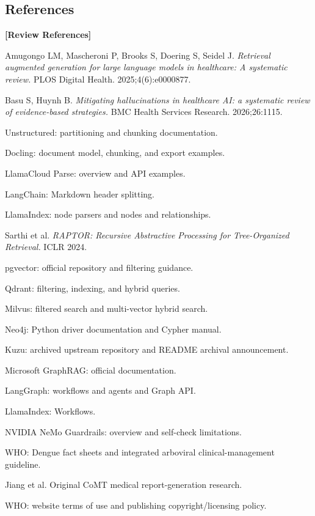 \documentclass[11pt,a4paper]{article}
\newcommand{\origintag}[2]{\textcolor{#1}{\small\textbf{[#2]}}}
\begin{document}
\subsection{References}
\origintag{amber}{Review References}
\begin{enumerate}[label={[\arabic*]}, font=\small, itemsep=2pt, parsep=0pt]
\scriptsize
\item Amugongo LM, Mascheroni P, Brooks S, Doering S, Seidel J. \textit{Retrieval augmented generation for large language models in healthcare: A systematic review.} PLOS Digital Health. 2025;4(6):e0000877.
\item Basu S, Huynh B. \textit{Mitigating hallucinations in healthcare AI: a systematic review of evidence-based strategies.} BMC Health Services Research. 2026;26:1115.
\item Unstructured: partitioning and chunking documentation.
\item Docling: document model, chunking, and export examples.
\item LlamaCloud Parse: overview and API examples.
\item LangChain: Markdown header splitting.
\item LlamaIndex: node parsers and nodes and relationships.
\item Sarthi et al. \textit{RAPTOR: Recursive Abstractive Processing for Tree-Organized Retrieval.} ICLR 2024.
\item pgvector: official repository and filtering guidance.
\item Qdrant: filtering, indexing, and hybrid queries.
\item Milvus: filtered search and multi-vector hybrid search.
\item Neo4j: Python driver documentation and Cypher manual.
\item Kuzu: archived upstream repository and README archival announcement.
\item Microsoft GraphRAG: official documentation.
\item LangGraph: workflows and agents and Graph API.
\item LlamaIndex: Workflows.
\item NVIDIA NeMo Guardrails: overview and self-check limitations.
\item WHO: Dengue fact sheets and integrated arboviral clinical-management guideline.
\item Jiang et al. Original CoMT medical report-generation research.
\item WHO: website terms of use and publishing copyright/licensing policy.
\end{enumerate}
\end{document}
